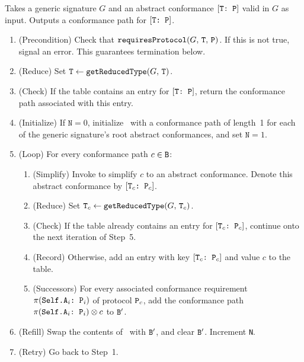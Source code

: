 \documentclass[../generics]{subfiles}
\begin{document}
\begin{algorithm}\label{find conformance path algorithm}
Takes a generic signature $G$ and an abstract conformance $[\texttt{T:~P}]$ valid in $G$ as input. Outputs a conformance path for $[\texttt{T:~P}]$.

\begin{enumerate}
\item (Precondition) Check that $\texttt{requiresProtocol}(G,\,\texttt{T},\,\texttt{P})$. If this is not true, signal an error. This guarantees termination below.

\item (Reduce) Set $\texttt{T}\leftarrow\texttt{getReducedType}(G,\,\texttt{T})$.

\item (Check) If the table contains an entry for $[\texttt{T:~P}]$, return the conformance path associated with this entry.

\item (Initialize) If $\texttt{N}=0$, initialize \nB\ with a conformance path of length~1 for each of the generic signature's root abstract conformances, and set $\texttt{N}=1$.

\item (Loop) For every conformance path $c\in \texttt{B}$:

\begin{enumerate}

\item (Simplify) Invoke  to simplify $c$ to an abstract conformance. Denote this abstract conformance by $[\texttt{$\texttt{T}_c$:~$\texttt{P}_c$}]$.

\item (Reduce) Set $\texttt{T}_c\leftarrow\texttt{getReducedType}(G,\,\texttt{T}_c)$.

\item (Check) If the table already contains an entry for $[\texttt{$\texttt{T}_c$:~$\texttt{P}_c$}]$, continue onto the next iteration of Step~5.

\item (Record) Otherwise, add an entry with key $[\texttt{$\texttt{T}_c$:~$\texttt{P}_c$}]$ and value $c$ to the table.

\item (Successors) For every associated conformance requirement $\pi(\texttt{Self.$\texttt{A}_i$:~$\texttt{P}_i$})$ of protocol $\texttt{P}_c$, add the conformance path $\pi(\texttt{Self.$\texttt{A}_i$:~$\texttt{P}_i$})\otimes c$ to $\texttt{B}^\prime$.
\end{enumerate}

\item (Refill) Swap the contents of \nB\ with $\texttt{B}^\prime$, and clear $\texttt{B}^\prime$. Increment \texttt{N}.

\item (Retry) Go back to Step~1.
\end{enumerate}
\end{algorithm}
\end{document}

